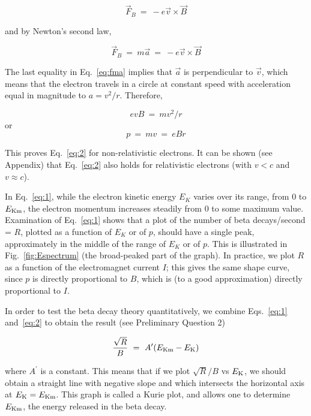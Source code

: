 \documentclass{article}
\begin{document}
\begin{equation}
\vec{F}_B~=~ - e \vec{v} \times \vec{B}
\end{equation}

and by Newton's second law,

\begin{equation}
\vec{F}_B~=~ m \vec{a} ~=~ - e \vec{v} \times \vec{B}
\label{eq:fma}
\end{equation}

The last equality in Eq.~\ref{eq:fma} implies that $\vec{a}$ is
perpendicular to $\vec{v}$, which means
that the electron travels in a circle at constant speed with
acceleration equal in magnitude to $a = v^2/r$.
Therefore,

\begin{equation}
evB~=~mv^2/r
\end{equation}
or
\begin{equation}
p~=~mv~=~eBr
\end{equation}

This proves Eq.~\ref{eq:2} for non-relativistic electrons.  It can be
shown (see Appendix) that Eq.~\ref{eq:2} also holds for relativistic electrons
(with $v < c$  and $v \approx c$).

In Eq.~\ref{eq:1}, while the electron kinetic energy
$E_K$ varies over its range, from 0 to
$E_{\rm Km}$, the electron  momentum
increases steadily from 0 to some maximum value.  Examination of Eq.~\ref{eq:1}
shows that a plot of the number of beta decays/second = $R$, plotted
as a function of $E_K$ or of $p$, should
have a single peak, approximately in the middle of the range of
$E_K$ or of $p$.  This is illustrated in
Fig.~\ref{fig:Espectrum} (the broad-peaked part of the graph).  In practice, we plot $R$
as a function of the electromagnet current $I$; this gives the same shape
curve, since $p$ is directly proportional to $B$, which is (to a good
approximation) directly proportional to $I$.

In order to test the beta decay theory quantitatively, we combine Eqs.~\ref{eq:1} and~\ref{eq:2}
to obtain the result (see Preliminary Question 2)

\begin{equation}
{\sqrt{R} \over B}~=~A^\prime (E_{\rm Km} - E_{\rm K})
\label{eq:kurie}
\end{equation}

where $A^\prime$ is a constant.  This means that if we
plot $\sqrt{R}/B$ vs $E_{\rm K}$, we should obtain a straight line
with negative slope and which intersects the horizontal axis at
$E_{\rm K} = E_{\rm Km}$.  This graph is called a Kurie
plot, and allows one to determine $E_{\rm Km}$, the energy released in the beta decay.
\end{document}
